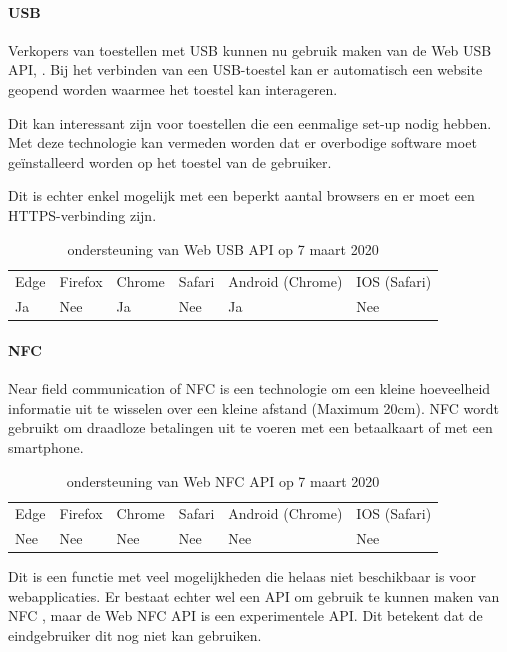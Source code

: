 \paragraph{USB}

Verkopers van toestellen met USB kunnen nu gebruik maken van de Web USB API, \autocite{Rockot2020}. Bij het verbinden van een USB-toestel kan er automatisch een website geopend worden waarmee het toestel kan interageren.
 
Dit kan interessant zijn voor toestellen die een eenmalige set-up nodig hebben. Met deze technologie kan vermeden worden dat er overbodige software moet geïnstalleerd worden op het toestel van de gebruiker. 

Dit is echter enkel mogelijk met een beperkt aantal browsers en er moet een HTTPS-verbinding zijn.
\autocite{Beaufort2019b}

\begin{table}[H]
	\centering
	\begin{tabular}{llllll}
		Edge & Firefox & Chrome & Safari & Android (Chrome) & IOS (Safari) \\
		Ja   & Nee      & Ja     & Nee     & Ja               & Nee          
	\end{tabular}	
	\caption{ondersteuning van Web USB API op 7 maart 2020}
\end{table}


\paragraph{NFC}

Near field communication of NFC is een technologie om een kleine hoeveelheid informatie uit te wisselen over een kleine afstand (Maximum 20cm). NFC wordt gebruikt om draadloze betalingen uit te voeren met een betaalkaart of met een smartphone. 
\autocite{Paus2007}

\begin{table}[H]
	\centering
	\begin{tabular}{llllll}
		Edge & Firefox & Chrome & Safari & Android (Chrome) & IOS (Safari) \\
		Nee   & Nee      &  Nee     & Nee     & Nee               & Nee          
	\end{tabular}	
	\caption{ondersteuning van Web NFC API op 7 maart 2020}
\end{table}

Dit is een functie met veel mogelijkheden die helaas niet beschikbaar is voor webapplicaties.
Er bestaat echter wel een API om gebruik te kunnen maken van NFC \autocite{RohdeChristiansen2020}, maar de Web NFC API is een experimentele API. Dit betekent dat de eindgebruiker dit nog niet kan gebruiken.




